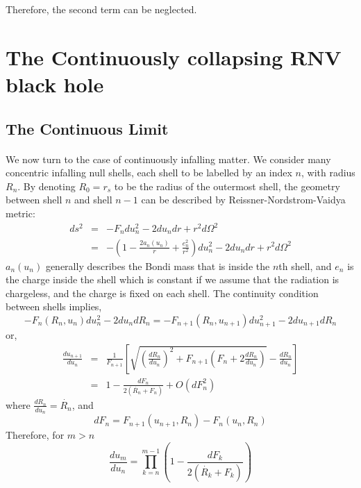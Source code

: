 \documentclass[letterpaper,12pt]{article}
\begin{document}
Therefore, the second term can be neglected.

\section{The Continuously collapsing RNV black hole}\label{sec:3}
\subsection{The Continuous Limit}\label{sec:3-1}
\paragraph{ }
We now turn to the case of continuously infalling matter. We  consider many concentric infalling null shells, each shell to be labelled by an index $n$, with radius $R_{n}$. By denoting $R_{0} = r_{s}$ to be the radius of the outermost shell, the geometry between shell $n$ and shell $n-1$ can be described by Reissner-Nordstrom-Vaidya metric:
\begin{eqnarray}
  ds^{2}  &=& -F_{n}du_{n}^2-2du_{n}dr+r^2d\Omega^2 \\
   &=& -\left(1-\frac{2a_{n}(u_{n})}{r}+\frac{e_{n}^{2}}{r^{2}} \right)du_{n}^{2}-2du_{n}dr +r^{2}d\Omega^2
\end{eqnarray}
 $a_{n}(u_{n})$ generally describes the Bondi mass that is inside the $n$th shell, and $e_{n}$ is the charge inside the shell which is constant if we assume that the radiation is chargeless, and the charge is fixed on each shell.
The continuity condition between shells implies,
\begin{equation}
-F_{n}(R_{n}, u_{n})du_{n}^{2}-2du_{n}dR_{n} = -F_{n+1}(R_{n}, u_{n+1})du_{n+1}^{2}-2du_{n+1}dR_{n}
\end{equation}
 or,
 \begin{eqnarray}
    \frac{du_{n+1}}{du_{n}} &=& \frac{1}{F_{n+1}}\left[\sqrt{\left(\frac{dR_{n}}{du_{n}}\right)^{2}+F_{n+1}\left(F_{n}+2\frac{dR_{n}}{du_{n}}\right)}
    -\frac{dR_{n}}{du_{n}} \right]\\
    &=& 1-\frac{dF_{n}}{2(\dot{R_{n}}+F_{n})} +O(dF^{2}_{n})
 \end{eqnarray}
where $\frac{dR_{n}}{du_{n}} = \dot{R_{n}}$, and
\begin{equation}
dF_{n} = F_{n+1}(u_{n+1}, R_{n})-F_{n}(u_{n}, R_{n})
\end{equation}
Therefore, for $m > n$
\begin{equation}
   \frac{du_{m}}{du_{n}} =\prod_{k=n}^{m-1}\left(1-\frac{dF_{k}}{2(\dot{R_{k}}+F_{k})}\right)
\end{equation}
\end{document}
